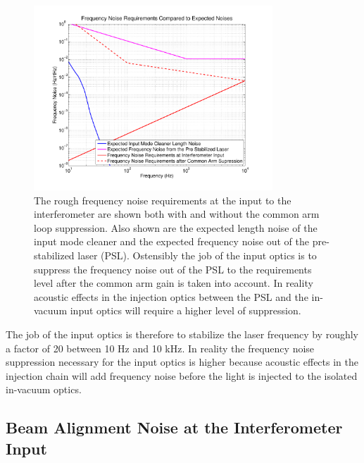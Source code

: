 \begin{figure}
	\centering
	\includegraphics[width = 0.8\textwidth,trim=2cm 1cm 2cm 1cm]{Freq_Noise_Reqs.pdf}
	\caption{The rough frequency noise requirements at the input to the interferometer are shown both 
		with and without the common arm loop suppression.  
		Also shown are the expected length noise of the input mode cleaner and the expected frequency 
		noise out of the pre-stabilized laser (PSL).  
		Ostensibly the job of the input optics is to suppress the frequency noise out of the PSL to 
		the requirements level after the common arm gain is taken into account.  
		In reality acoustic effects in the injection optics between the PSL and the in-vacuum input 
		optics will require a higher level of suppression.}
	\label{fig:FreqReqs}
\end{figure}

The job of the input optics is therefore to stabilize the laser frequency by roughly a factor of 20 
between 10 Hz and 10 kHz.  
In reality the frequency noise suppression necessary for the input optics is higher because 
acoustic effects in the injection chain will add frequency noise before the light is injected 
to the isolated in-vacuum optics.  


\subsection{Beam Alignment Noise at the Interferometer Input}
\label{sec:beam_alignment_noise}

